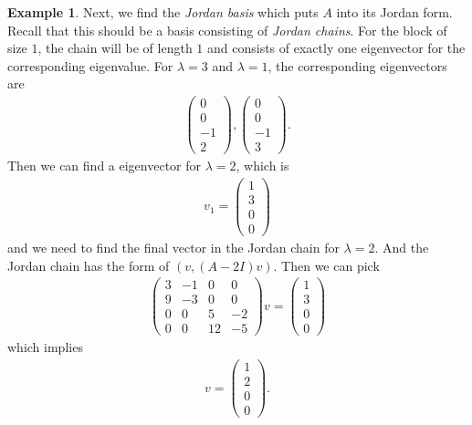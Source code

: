 \documentclass[11pt]{book}
\theoremstyle{definition}
\newtheorem{example}{Example}[section]
\numberwithin{equation}{subsection}
\begin{document}
\begin{example}
Next, we find the \emph{Jordan basis} which puts $A$ into its Jordan form. Recall that this should be a basis consisting of \emph{Jordan chains}. For the block of size $1$, the chain will be of length $1$ and consists of exactly one eigenvector for the corresponding eigenvalue. For $\lambda = 3$ and $\lambda = 1$, the corresponding eigenvectors are 
\begin{align*}
    \begin{pmatrix}
    0 \\
    0 \\
    -1 \\
    2
    \end{pmatrix}, \begin{pmatrix}
    0 \\
    0 \\
    -1 \\
    3
    \end{pmatrix}.
\end{align*}
Then we can find a eigenvector for $\lambda = 2$, which is 
\begin{align*}
    v_1 = \begin{pmatrix}
    1 \\
    3 \\
    0 \\
    0
    \end{pmatrix}
\end{align*}
and we need to find the final vector in the Jordan chain for $\lambda = 2$. And the Jordan chain has the form of $(v, (A-2I)v)$. Then we can pick 
\begin{align*}
    \begin{pmatrix}
    3 & -1 & 0 & 0 \\
    9 & -3 & 0 & 0 \\
    0 & 0 & 5 & -2 \\
    0 & 0 & 12 & -5
    \end{pmatrix} v = \begin{pmatrix}
    1 \\
    3 \\
    0 \\
    0
    \end{pmatrix}
\end{align*}
which implies 
\begin{align*}
    v = \begin{pmatrix}
    1 \\
    2 \\
    0 \\
    0
    \end{pmatrix}.

\end{align*}
\end{example}
\end{document}
